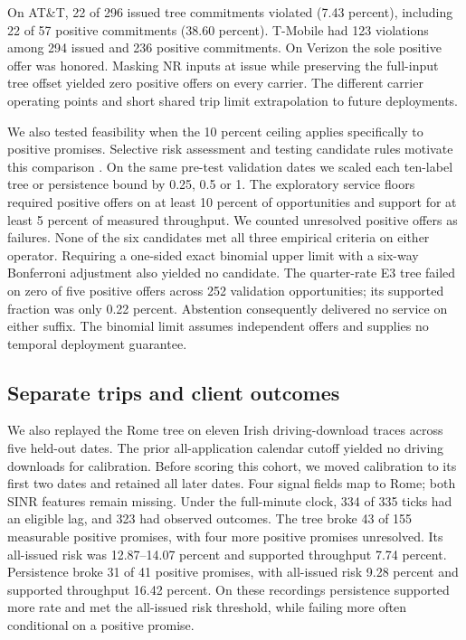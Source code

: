\documentclass[journal,onecolumn,10pt]{IEEEtran}
\begin{document}
On AT\&T, 22 of 296 issued tree commitments violated (7.43 percent), including 22 of 57 positive commitments (38.60 percent). T-Mobile had 123 violations among 294 issued and 236 positive commitments. On Verizon the sole positive offer was honored. Masking NR inputs at issue while preserving the full-input tree offset yielded zero positive offers on every carrier. The different carrier operating points and short shared trip limit extrapolation to future deployments.

We also tested feasibility when the 10 percent ceiling applies specifically to positive promises. Selective risk assessment and testing candidate rules motivate this comparison \cite{geifman2017,angelopoulos2021ltt}. On the same pre-test validation dates we scaled each ten-label tree or persistence bound by 0.25, 0.5 or 1. The exploratory service floors required positive offers on at least 10 percent of opportunities and support for at least 5 percent of measured throughput. We counted unresolved positive offers as failures. None of the six candidates met all three empirical criteria on either operator. Requiring a one-sided exact binomial upper limit with a six-way Bonferroni adjustment also yielded no candidate. The quarter-rate E3 tree failed on zero of five positive offers across 252 validation opportunities; its supported fraction was only 0.22 percent. Abstention consequently delivered no service on either suffix. The binomial limit assumes independent offers and supplies no temporal deployment guarantee.

\subsection{Separate trips and client outcomes}
We also replayed the Rome tree on eleven Irish driving-download traces across five held-out dates. The prior all-application calendar cutoff yielded no driving downloads for calibration. Before scoring this cohort, we moved calibration to its first two dates and retained all later dates. Four signal fields map to Rome; both SINR features remain missing. Under the full-minute clock, 334 of 335 ticks had an eligible lag, and 323 had observed outcomes. The tree broke 43 of 155 measurable positive promises, with four more positive promises unresolved. Its all-issued risk was 12.87--14.07 percent and supported throughput 7.74 percent. Persistence broke 31 of 41 positive promises, with all-issued risk 9.28 percent and supported throughput 16.42 percent. On these recordings persistence supported more rate and met the all-issued risk threshold, while failing more often conditional on a positive promise.
\end{document}
